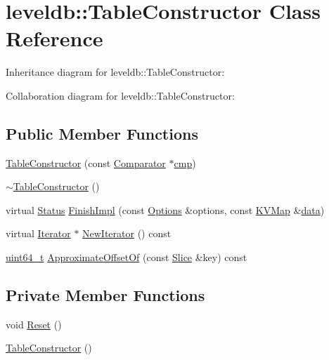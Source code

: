 \hypertarget{classleveldb_1_1_table_constructor}{\section{leveldb\-:\-:Table\-Constructor Class Reference}
\label{classleveldb_1_1_table_constructor}
}


Inheritance diagram for leveldb\-:\-:Table\-Constructor\-:


Collaboration diagram for leveldb\-:\-:Table\-Constructor\-:
\subsection*{Public Member Functions}
\begin{DoxyCompactItemize}
\item 
\hyperlink{classleveldb_1_1_table_constructor_acfc791dc15a8fac77f9715fda659eb19}{Table\-Constructor} (const \hyperlink{structleveldb_1_1_comparator}{Comparator} $\ast$\hyperlink{table__test_8cc_a87863e435922f0910ca8db43f02a6c0b}{cmp})
\item 
\hyperlink{classleveldb_1_1_table_constructor_a4be60433281b7d5e6aa37688be8d1631}{$\sim$\-Table\-Constructor} ()
\item 
virtual \hyperlink{classleveldb_1_1_status}{Status} \hyperlink{classleveldb_1_1_table_constructor_aa8ce3799a55859c2dee50d3e08f56ef2}{Finish\-Impl} (const \hyperlink{structleveldb_1_1_options}{Options} \&options, const \hyperlink{namespaceleveldb_aac1e50450147be263e08252c6700f7a7}{K\-V\-Map} \&\hyperlink{classleveldb_1_1_constructor_a55a0363200d6e86d8beb3b15b75e3824}{data})
\item 
virtual \hyperlink{classleveldb_1_1_iterator}{Iterator} $\ast$ \hyperlink{classleveldb_1_1_table_constructor_a4897f3cb58fed2bd3a9f7f6468b6a105}{New\-Iterator} () const 
\item 
\hyperlink{stdint_8h_aaa5d1cd013383c889537491c3cfd9aad}{uint64\-\_\-t} \hyperlink{classleveldb_1_1_table_constructor_a798ee199e8fdc5ec020725dba32a4cb6}{Approximate\-Offset\-Of} (const \hyperlink{classleveldb_1_1_slice}{Slice} \&key) const 
\end{DoxyCompactItemize}
\subsection*{Private Member Functions}
\begin{DoxyCompactItemize}
\item 
void \hyperlink{classleveldb_1_1_table_constructor_abec5d786710e07f6c97d303760de5c59}{Reset} ()
\item 
\hyperlink{classleveldb_1_1_table_constructor_abb22915c3e423fbdbe8484516e9ad1e9}{Table\-Constructor} ()
\end{DoxyCompactItemize}
